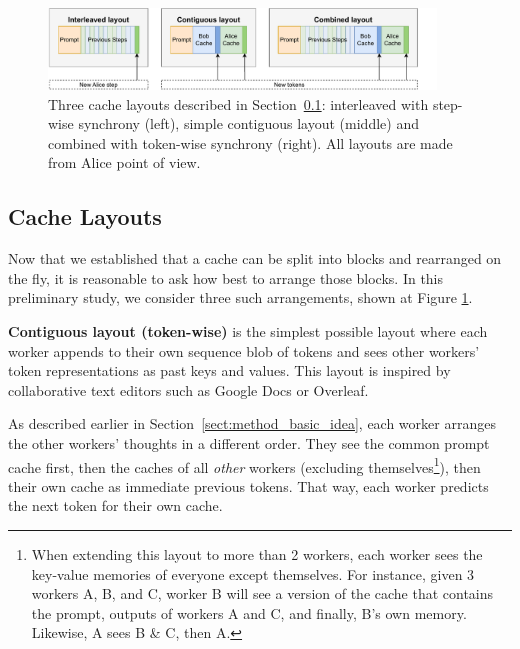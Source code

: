 \begin{figure}[t]
    \centering
    \vspace{-20px}
    \includegraphics[width=1.045\linewidth,height=82px]{resources/figure2_fixed.pdf}
    \caption{Three cache layouts described in Section~\ref{sect:method_cache_layouts}: interleaved with step-wise synchrony (left), simple contiguous layout (middle) and combined with token-wise synchrony (right). All layouts are made from Alice point of view.}
    \label{fig:layouts}\vspace{-15px}
\end{figure}


\vspace{-5px}\subsection{Cache Layouts}\label{sect:method_cache_layouts}\vspace{-5px}

Now that we established that a cache can be split into blocks and rearranged on the fly, it is reasonable to ask how best to arrange those blocks. In this preliminary study, we consider three such arrangements, shown at Figure \ref{fig:layouts}.

\textbf{Contiguous layout (token-wise)} is the simplest possible layout
where each worker appends to their own sequence blob of tokens and sees other workers' token representations as past keys and values. This layout is inspired by collaborative text editors such as Google Docs or Overleaf.

As described earlier in Section~\ref{sect:method_basic_idea}, each worker arranges the other workers' thoughts in a different order. They see the common prompt cache first, then the caches of all \textit{other} workers (excluding themselves\footnote[5]{When extending this layout to more than 2 workers, each worker sees the key-value memories of everyone except themselves. For instance, given 3 workers A, B, and C, worker B will see a version of the cache that contains the prompt, outputs of workers A and C, and finally, B's own memory. Likewise, A sees B \& C, then A. }), then their own cache as immediate previous tokens. That way, each worker predicts the next token for their own cache.

